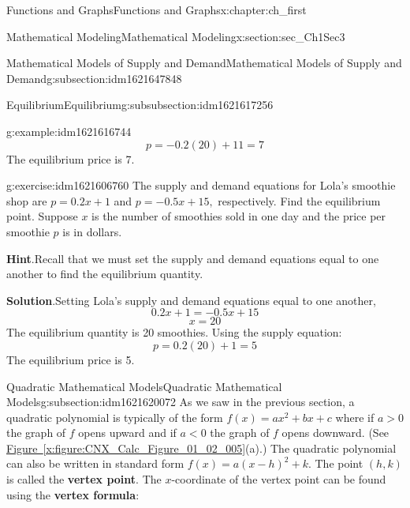 \documentclass[oneside,10pt,]{book}
\newcommand{\blocktitlefont}{\relax}
\newcommand{\xreffont}{\relax}
\newcommand{\terminology}[1]{\textbf{#1}}
\numberwithin{equation}{section}
\newcommand{\lt}{<}
\newcommand{\gt}{>}
\begin{document}
\begin{chapterptx}{Functions and Graphs}{}{Functions and Graphs}{}{}{x:chapter:ch_first}
\begin{sectionptx}{Mathematical Modeling}{}{Mathematical Modeling}{}{}{x:section:sec_Ch1Sec3}
\begin{subsectionptx}{Mathematical Models of Supply and Demand}{}{Mathematical Models of Supply and Demand}{}{}{g:subsection:idm1621647848}
\begin{subsubsectionptx}{Equilibrium}{}{Equilibrium}{}{}{g:subsubsection:idm1621617256}
\begin{example}{}{g:example:idm1621616744}
\begin{equation*}
p=-0.2(20)+11=7
\end{equation*}
The equilibrium price is \textdollar{}7.\end{example}
\begin{inlineexercise}{}{g:exercise:idm1621606760}%
The supply and demand equations for Lola's smoothie shop are \(p=0.2x+1\) and \(p=-0.5x+15,\) respectively. Find the equilibrium point. Suppose \(x\) is the number of smoothies sold in one day and the price per smoothie \(p\) is in dollars.\par\smallskip%
\noindent\textbf{\blocktitlefont Hint}.\hypertarget{g:hint:idm1621605352}{}\quad{}Recall that we must set the supply and demand equations equal to one another to find the equilibrium quantity.\par\smallskip%
\noindent\textbf{\blocktitlefont Solution}.\hypertarget{g:solution:idm1621607656}{}\quad{}Setting Lola's supply and demand equations equal to one another,%
\begin{equation*}
0.2x+1=-0.5x+15
\end{equation*}
%
\begin{equation*}
x=20
\end{equation*}
The equilibrium quantity is 20 smoothies.%
 Using the supply equation:%
\begin{equation*}
p=0.2(20)+1=5
\end{equation*}
The equilibrium price is \textdollar{}5.\end{inlineexercise}%
\end{subsubsectionptx}
\end{subsectionptx}
%
%
\typeout{************************************************}
\typeout{************************************************}
%
\begin{subsectionptx}{Quadratic Mathematical Models}{}{Quadratic Mathematical Models}{}{}{g:subsection:idm1621620072}
As we saw in the previous section, a quadratic polynomial is typically of the form \(f(x)=ax^2+bx+c\) where if \(a\gt 0\) the graph of \(f\) opens upward and if \(a\lt 0\) the graph of \(f\) opens downward. (See \hyperref[x:figure:CNX_Calc_Figure_01_02_005]{Figure~{\xreffont\ref{x:figure:CNX_Calc_Figure_01_02_005}}}(a).) The quadratic polynomial can also be written in standard form \(f(x)=a(x-h)^2+k\). The point \((h,k)\) is called the \terminology{vertex point}. The \(x\)-coordinate of the vertex point can be found using the \terminology{vertex formula}:%
\begin{equation*}

\end{equation*}
\end{subsectionptx}
\end{sectionptx}
\end{chapterptx}
\end{document}
